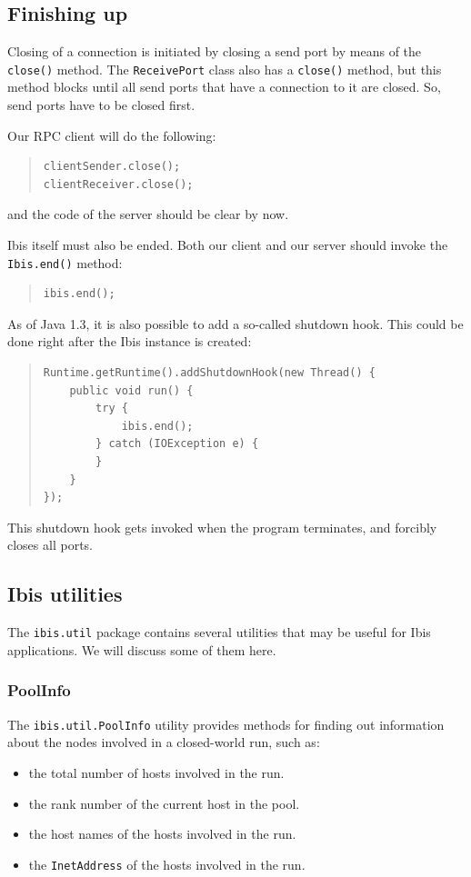 \documentclass[10pt]{article}
\newcommand{\mysubsection}[1]{\subsection{#1}\label{#1}}
\newcommand{\mysubsubsection}[1]{\subsubsection{#1}\label{#1}}
\begin{document}
\subsection{Finishing up}

Closing of a connection is initiated by closing a send port
by means of the \texttt{close()} method. The \texttt{ReceivePort}
class also has a \texttt{close()} method, but this method blocks
until all send ports that have a connection to it are closed.
So, send ports have to be closed first.

Our RPC client will do the following:

{\small
\begin{quote}
\begin{verbatim}
clientSender.close();
clientReceiver.close();
\end{verbatim}
\end{quote}
}
and the code of the server should be clear by now.

Ibis itself must also be ended. Both our client and our server
should invoke the \texttt{Ibis.end()} method:
{\small
\begin{quote}
\begin{verbatim}
ibis.end();
\end{verbatim}
\end{quote}
}

As of Java 1.3, it is also possible to add a so-called shutdown hook.
This could be done right after the Ibis instance is created:
{\small
\begin{quote}
\begin{verbatim}
Runtime.getRuntime().addShutdownHook(new Thread() {
    public void run() {
        try {
            ibis.end();
        } catch (IOException e) {
        }
    }
});
\end{verbatim}
\end{quote}
}
\noindent
This shutdown hook gets invoked when the program terminates, and
forcibly closes all ports.

\mysubsection{Ibis utilities}

The \texttt{ibis.util} package contains several utilities that may be
useful for Ibis applications. We will discuss some of them here.

\mysubsubsection{PoolInfo}

The \texttt{ibis.util.PoolInfo} utility
provides methods for finding out information about the nodes
involved in a closed-world run, such as:
\begin{itemize}
\item
the total number of hosts involved in the run.
\item
the rank number of the current host in the pool.
\item
the host names of the hosts involved in the run.
\item
the \texttt{InetAddress} of the hosts involved in the run.
\end{itemize}
\end{document}
